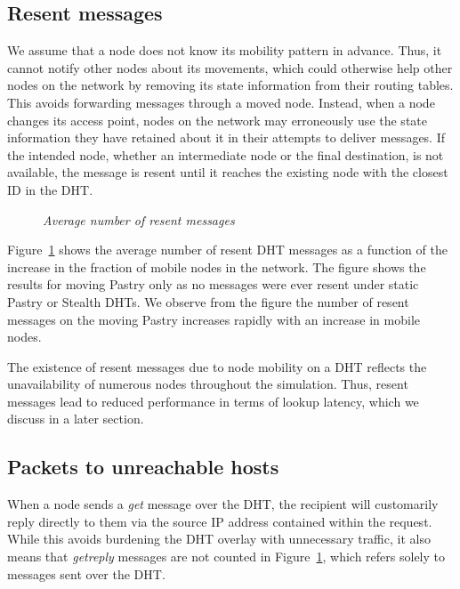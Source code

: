\documentclass[conference]{IEEEtran}
\begin{document}

\subsection{Resent messages}
We assume that a node does not know its mobility pattern in advance.
Thus, it cannot notify other nodes about its movements, which could
otherwise help other nodes on the network by removing its state
information from their routing tables. This avoids forwarding
messages through a moved node. Instead, when a node changes its
access point, nodes on the network may erroneously use the state
information they have retained about it in their attempts to deliver
messages. If the intended node, whether an intermediate node or the
final destination, is not available, the message is resent until it
reaches the existing node with the closest ID in the DHT.

\begin{figure}[htb]
\centering {}
\caption{\em Average number of resent messages} \label{fig:rsnt}
\end{figure}

Figure~\ref{fig:rsnt} shows the average number of resent DHT
messages as a function of the increase in the fraction of mobile
nodes in the network. The figure shows the results for moving Pastry
only as no messages were ever resent under static Pastry or Stealth
DHTs. We observe from the figure the number of resent messages on
the moving Pastry increases rapidly with an increase in mobile
nodes.

The existence of resent messages due to node mobility on a DHT
reflects the unavailability of numerous nodes throughout the
simulation. Thus, resent messages lead to reduced performance in
terms of lookup latency, which we discuss in a later section.

\subsection{Packets to unreachable hosts}
When a node sends a {\em get} message over the DHT, the recipient
will customarily reply directly to them via the source IP address
contained within the request. While this avoids burdening the DHT
overlay with unnecessary traffic, it also means that {\em getreply}
messages are not counted in Figure~\ref{fig:rsnt}, which refers
solely to messages sent over the DHT.
\end{document}
